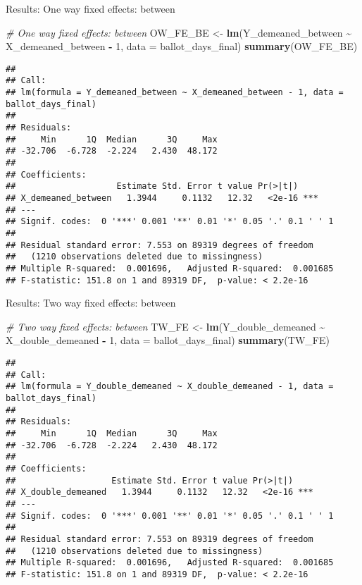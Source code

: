 \documentclass[
]{book}
\newenvironment{Shaded}{\begin{snugshade}}{\end{snugshade}}
\newcommand{\AttributeTok}[1]{\textcolor[rgb]{0.13,0.29,0.53}{#1}}
\newcommand{\CommentTok}[1]{\textcolor[rgb]{0.56,0.35,0.01}{\textit{#1}}}
\newcommand{\DecValTok}[1]{\textcolor[rgb]{0.00,0.00,0.81}{#1}}
\newcommand{\FunctionTok}[1]{\textcolor[rgb]{0.13,0.29,0.53}{\textbf{#1}}}
\newcommand{\NormalTok}[1]{#1}
\newcommand{\OtherTok}[1]{\textcolor[rgb]{0.56,0.35,0.01}{#1}}
\newcommand{\SpecialCharTok}[1]{\textcolor[rgb]{0.81,0.36,0.00}{\textbf{#1}}}
\begin{document}
Results: One way fixed effects: between

\begin{Shaded}
\begin{Highlighting}[]
\CommentTok{\# One way fixed effects: between}
\NormalTok{OW\_FE\_BE }\OtherTok{\textless{}{-}} \FunctionTok{lm}\NormalTok{(Y\_demeaned\_between }\SpecialCharTok{\textasciitilde{}}\NormalTok{ X\_demeaned\_between }\SpecialCharTok{{-}} \DecValTok{1}\NormalTok{, }\AttributeTok{data =}\NormalTok{ ballot\_days\_final)}
\FunctionTok{summary}\NormalTok{(OW\_FE\_BE)}
\end{Highlighting}
\end{Shaded}

\begin{verbatim}
## 
## Call:
## lm(formula = Y_demeaned_between ~ X_demeaned_between - 1, data = ballot_days_final)
## 
## Residuals:
##     Min      1Q  Median      3Q     Max 
## -32.706  -6.728  -2.224   2.430  48.172 
## 
## Coefficients:
##                    Estimate Std. Error t value Pr(>|t|)    
## X_demeaned_between   1.3944     0.1132   12.32   <2e-16 ***
## ---
## Signif. codes:  0 '***' 0.001 '**' 0.01 '*' 0.05 '.' 0.1 ' ' 1
## 
## Residual standard error: 7.553 on 89319 degrees of freedom
##   (1210 observations deleted due to missingness)
## Multiple R-squared:  0.001696,   Adjusted R-squared:  0.001685 
## F-statistic: 151.8 on 1 and 89319 DF,  p-value: < 2.2e-16
\end{verbatim}

Results: Two way fixed effects: between

\begin{Shaded}
\begin{Highlighting}[]
\CommentTok{\# Two way fixed effects: between}
\NormalTok{TW\_FE }\OtherTok{\textless{}{-}} \FunctionTok{lm}\NormalTok{(Y\_double\_demeaned }\SpecialCharTok{\textasciitilde{}}\NormalTok{ X\_double\_demeaned }\SpecialCharTok{{-}} \DecValTok{1}\NormalTok{, }\AttributeTok{data =}\NormalTok{ ballot\_days\_final)}
\FunctionTok{summary}\NormalTok{(TW\_FE)}
\end{Highlighting}
\end{Shaded}

\begin{verbatim}
## 
## Call:
## lm(formula = Y_double_demeaned ~ X_double_demeaned - 1, data = ballot_days_final)
## 
## Residuals:
##     Min      1Q  Median      3Q     Max 
## -32.706  -6.728  -2.224   2.430  48.172 
## 
## Coefficients:
##                   Estimate Std. Error t value Pr(>|t|)    
## X_double_demeaned   1.3944     0.1132   12.32   <2e-16 ***
## ---
## Signif. codes:  0 '***' 0.001 '**' 0.01 '*' 0.05 '.' 0.1 ' ' 1
## 
## Residual standard error: 7.553 on 89319 degrees of freedom
##   (1210 observations deleted due to missingness)
## Multiple R-squared:  0.001696,   Adjusted R-squared:  0.001685 
## F-statistic: 151.8 on 1 and 89319 DF,  p-value: < 2.2e-16
\end{verbatim}
\end{document}
